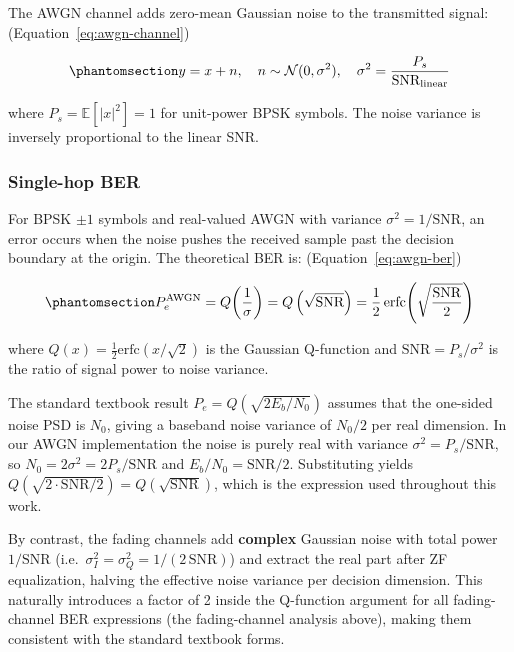 The AWGN channel adds zero-mean Gaussian noise to the transmitted signal: (Equation~\ref{eq:awgn-channel})

\begin{equation}\protect\phantomsection\label{eq:awgn-channel}{y = x + n, \quad n \sim \mathcal{N}(0, \sigma^2), \quad \sigma^2 = \frac{P_s}{\text{SNR}_{\text{linear}}}
}\end{equation}

where \(P_s = \mathbb{E}[|x|^2] = 1\) for unit-power BPSK symbols. The noise variance is inversely proportional to the linear SNR.

\subsubsection{Single-hop BER}\label{sec:awgn-single-hop-ber}
 For BPSK \(\pm 1\) symbols and real-valued AWGN with variance \(\sigma^2 = 1/\text{SNR}\), an error occurs when the noise pushes the received sample past the decision boundary at the origin. The theoretical BER is: (Equation~\ref{eq:awgn-ber})

\begin{equation}\protect\phantomsection\label{eq:awgn-ber}{P_e^{\text{AWGN}} = Q\!\left(\frac{1}{\sigma}\right) = Q\left(\sqrt{\text{SNR}}\right) = \frac{1}{2}\,\text{erfc}\!\left(\sqrt{\frac{\text{SNR}}{2}}\right)
}\end{equation}

where \(Q(x) = \frac{1}{2}\text{erfc}(x/\sqrt{2})\) is the Gaussian Q-function and \(\text{SNR} = P_s / \sigma^2\) is the ratio of signal power to noise variance.

\begin{remark}\label{noise-convension}
The standard textbook result \(P_e = Q(\sqrt{2 E_b/N_0})\) assumes that the one-sided noise PSD is \(N_0\), giving a baseband noise variance of \(N_0/2\) per real dimension. In our AWGN implementation the noise is purely real with variance \(\sigma^2 = P_s/\text{SNR}\), so \(N_0 = 2\sigma^2 = 2P_s/\text{SNR}\) and \(E_b/N_0 = \text{SNR}/2\). Substituting yields \(Q(\sqrt{2 \cdot \text{SNR}/2}) = Q(\sqrt{\text{SNR}})\), which is the expression used throughout this work.

By contrast, the fading channels add \textbf{complex} Gaussian noise with total power \(1/\text{SNR}\) (i.e.~\(\sigma_I^2 = \sigma_Q^2 = 1/(2\,\text{SNR})\)) and extract the real part after ZF equalization, halving the effective noise variance per decision dimension. This naturally introduces a factor of 2 inside the Q-function argument for all fading-channel BER expressions (the fading-channel analysis above), making them consistent with the standard textbook forms.
\end{remark}

